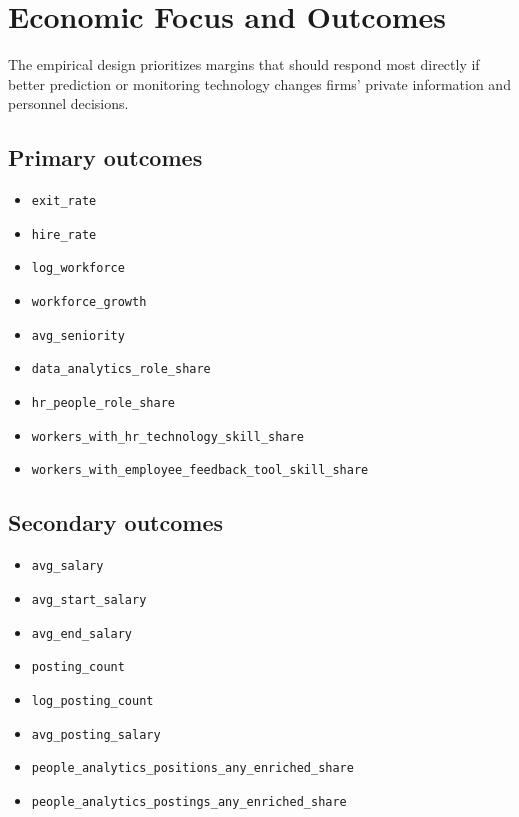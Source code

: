 \documentclass[11pt]{article}
\begin{document}
\section{Economic Focus and Outcomes}

The empirical design prioritizes margins that should respond most directly if better prediction or monitoring technology changes firms' private information and personnel decisions.

\subsection*{Primary outcomes}

\begin{itemize}[leftmargin=1.5em]
    \item \texttt{exit\_rate}
    \item \texttt{hire\_rate}
    \item \texttt{log\_workforce}
    \item \texttt{workforce\_growth}
    \item \texttt{avg\_seniority}
    \item \texttt{data\_analytics\_role\_share}
    \item \texttt{hr\_people\_role\_share}
    \item \texttt{workers\_with\_hr\_technology\_skill\_share}
    \item \texttt{workers\_with\_employee\_feedback\_tool\_skill\_share}
\end{itemize}

\subsection*{Secondary outcomes}

\begin{itemize}[leftmargin=1.5em]
    \item \texttt{avg\_salary}
    \item \texttt{avg\_start\_salary}
    \item \texttt{avg\_end\_salary}
    \item \texttt{posting\_count}
    \item \texttt{log\_posting\_count}
    \item \texttt{avg\_posting\_salary}
    \item \texttt{people\_analytics\_positions\_any\_enriched\_share}
    \item \texttt{people\_analytics\_postings\_any\_enriched\_share}
\end{itemize}
\end{document}
